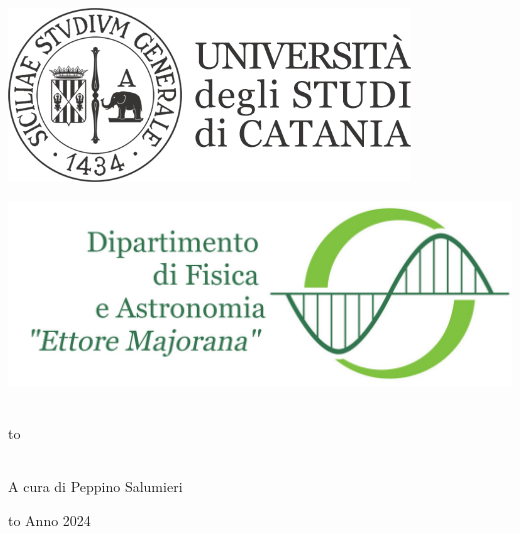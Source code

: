 \documentclass[12pt]{book}
\newcommand\blankpage{%
    \null
    \thispagestyle{empty}%
    \newpage} %
\begin{document}
\thispagestyle{empty}
\begin{center}

\begin{minipage}[c]{0.45\textwidth}
\begin{flushleft}
\includegraphics[width=0.8\textwidth]{logo-unict-orizzontale-grigio.png}
\end{flushleft}
\end{minipage}
\hfill
\begin{minipage}[c]{0.45\textwidth}
\begin{flushright}
\includegraphics[width=\textwidth]{logo_dfa_orizzontale}
\end{flushright}
\end{minipage}\\
\medskip
\hbox to \textwidth{\hrulefill}

\vfill
\vfill

\uppercase{}\\

\vfill
\large{A cura di Peppino Salumieri}

\vfill
\vfill
\hbox to \textwidth{\hrulefill}
{\sc Anno 2024}
\end{center}

\afterpage{\blankpage}
\newpage

\clearpage                       %
{                                %
  \pagestyle{empty}              %
  {
    \fancyhf{}%
    \renewcommand{\headrulewidth}{0pt}%
    \renewcommand{\footrulewidth}{0pt}%
  }
  \tableofcontents
  \thispagestyle{empty}          %
} %
\end{document}

